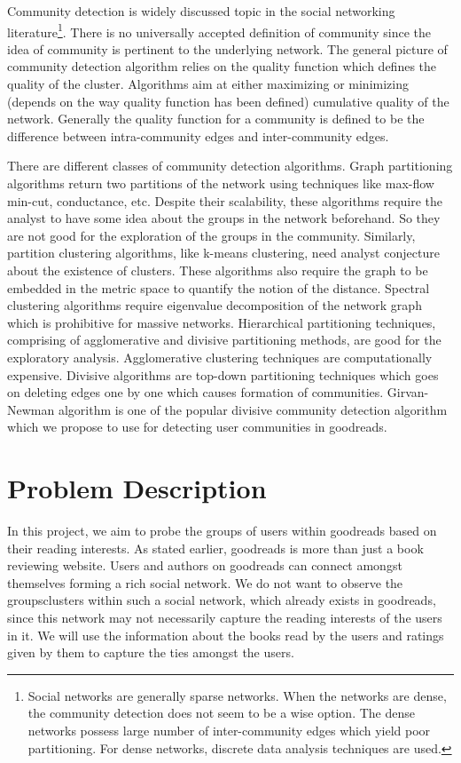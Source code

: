 \documentclass[11pt]{article}
\begin{document}
Community detection is widely discussed topic in the social networking literature\footnote{Social networks are generally sparse networks. When the networks are dense, the community detection does not seem to be a wise option. The dense networks possess large number of inter-community edges which yield poor partitioning. For dense networks, discrete data analysis techniques are used.}\cite{clauset}.
There is no universally accepted definition of community since the idea of community is pertinent to the underlying network.
The general picture of community detection algorithm relies on the quality function which defines the quality of the cluster.
Algorithms aim at either maximizing or minimizing (depends on the way quality function has been defined) cumulative quality of the network.
Generally the quality function for a community is defined to be the difference between intra-community edges and inter-community edges.

There are different classes of community detection algorithms.
Graph partitioning algorithms return two partitions of the network using techniques like max-flow min-cut, conductance, etc.
Despite their scalability, these algorithms require the analyst to have some idea about the groups in the network beforehand.
So they are not good for the exploration of the groups in the community.
Similarly, partition clustering algorithms, like k-means clustering, need analyst conjecture about the existence of clusters.
These algorithms also require the graph to be embedded in the metric space to quantify the notion of the distance.
Spectral clustering algorithms require eigenvalue decomposition of the network graph which is prohibitive for massive networks.
Hierarchical partitioning techniques, comprising of agglomerative and divisive partitioning methods, are good for the exploratory analysis.
Agglomerative clustering techniques are computationally expensive. Divisive algorithms are top-down partitioning techniques which goes on deleting edges one by one which causes formation of communities. Girvan-Newman algorithm is one of the popular divisive community detection algorithm which we propose to use for detecting user communities in goodreads.


\section{Problem Description}
In this project, we aim to probe the groups of users within goodreads based on their reading interests. As stated earlier, goodreads is more than just a book reviewing website. Users and authors on goodreads can connect amongst themselves forming a rich social network. We do not want to observe the groups\/clusters within such a social network, which already exists in goodreads, since this network may not necessarily capture the reading interests of the users in it. We will use the information about the books read by the users and ratings given by them to capture the ties amongst the users.\\
\end{document}
